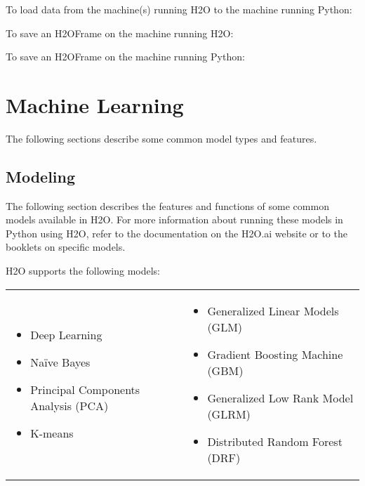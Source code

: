 {To load data from the machine(s) running H2O to the machine running Python:


To save an H2OFrame on the machine running H2O:


To save an H2OFrame on the machine running Python:


\section{Machine Learning}

The following sections describe some common model types and features. 

\subsection{Modeling}
The following section describes the features and functions of some common models available in H2O.  For more information about running these models in Python using H2O, refer to the documentation on
the H2O.ai website or to the booklets on specific models.


H2O supports the following models:  

\begin{frame}%

\begin{tabular}{p{5.0cm}p{6.0cm}}

\begin{itemize}
  \item Deep Learning
  \item Na\"{i}ve Bayes
  \item Principal Components Analysis (PCA)
  \item K-means
\end{itemize} &

\begin{itemize}
  \item Generalized Linear Models (GLM) 
  \item Gradient Boosting Machine (GBM)
  \item Generalized Low Rank Model (GLRM)
  \item Distributed Random Forest (DRF)
\end{itemize}


\end{tabular}
\end{frame}}
